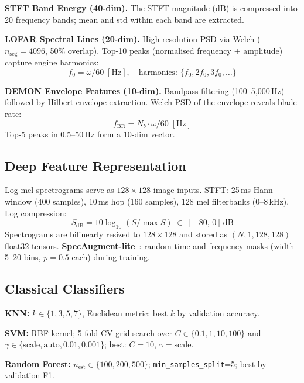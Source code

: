 \documentclass[conference]{IEEEtran}
\begin{document}
\textbf{STFT Band Energy (40-dim).}
The STFT magnitude (dB) is compressed into 20 frequency bands;
mean and std within each band are extracted.

\textbf{LOFAR Spectral Lines (20-dim).}
High-resolution PSD via Welch ($n_\mathrm{seg}=4096$, 50\% overlap).
Top-10 peaks (normalised frequency + amplitude) capture engine harmonics:
\begin{equation}
  f_0 = \omega/60 \; [\mathrm{Hz}], \quad
  \text{harmonics: } \{f_0, 2f_0, 3f_0, \ldots\}
  \label{eq:lofar}
\end{equation}

\textbf{DEMON Envelope Features (10-dim).}
Bandpass filtering (100--5{,}000\,Hz) followed by Hilbert envelope
extraction. Welch PSD of the envelope reveals blade-rate:
\begin{equation}
  f_\mathrm{BR} = N_b \cdot \omega/60 \; [\mathrm{Hz}]
  \label{eq:demon}
\end{equation}
Top-5 peaks in 0.5--50\,Hz form a 10-dim vector.

\subsection{Deep Feature Representation}

Log-mel spectrograms serve as $128{\times}128$ image inputs.
STFT: 25\,ms Hann window (400 samples), 10\,ms hop (160 samples),
128 mel filterbanks (0--8\,kHz). Log compression:
\begin{equation}
  S_\mathrm{dB} = 10\log_{10}(S/\max S) \;\in\; [-80,\,0]\,\mathrm{dB}
  \label{eq:logmel}
\end{equation}
Spectrograms are bilinearly resized to $128{\times}128$ and stored as
$(N,1,128,128)$ float32 tensors.
\textbf{SpecAugment-lite}~\cite{park2019}: random time and frequency
masks (width 5--20 bins, $p=0.5$ each) during training.

\subsection{Classical Classifiers}

\textbf{KNN:} $k\in\{1,3,5,7\}$, Euclidean metric; best $k$ by
validation accuracy.

\textbf{SVM:} RBF kernel; 5-fold CV grid search over
$C\in\{0.1,1,10,100\}$ and
$\gamma\in\{\text{scale},\text{auto},0.01,0.001\}$; best: $C=10$,
$\gamma=\text{scale}$.

\textbf{Random Forest:} $n_\mathrm{est}\in\{100,200,500\}$;
\texttt{min\_samples\_split}=5; best by validation F1.
\end{document}
